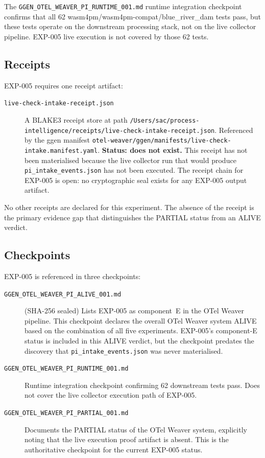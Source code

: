 The \texttt{GGEN\_OTEL\_WEAVER\_PI\_RUNTIME\_001.md} runtime integration checkpoint confirms
that all 62 wasm4pm/wasm4pm-compat/blue\_river\_dam tests pass, but these tests operate on
the downstream processing stack, not on the live collector pipeline. EXP-005 live execution
is not covered by those 62 tests.

\subsection{Receipts}
\label{sec:otel-weaver-exp-005-collector-to-intake-evidence-receipts}

EXP-005 requires one receipt artifact:

\begin{description}
  \item[\texttt{live-check-intake-receipt.json}] A BLAKE3 receipt store at path
        \texttt{/Users/sac/process-intelligence/receipts/live-check-intake-receipt.json}.
        Referenced by the ggen manifest
        \texttt{otel-weaver/ggen/manifests/live-check-intake.manifest.yaml}.
        \textbf{Status: does not exist.} This receipt has not been materialised because the
        live collector run that would produce \texttt{pi\_intake\_events.json} has not been
        executed. The receipt chain for EXP-005 is open: no cryptographic seal exists for any
        EXP-005 output artifact.
\end{description}

No other receipts are declared for this experiment. The absence of the receipt is the primary
evidence gap that distinguishes the PARTIAL status from an ALIVE verdict.

\subsection{Checkpoints}
\label{sec:otel-weaver-exp-005-collector-to-intake-evidence-checkpoints}

EXP-005 is referenced in three checkpoints:

\begin{description}
  \item[\texttt{GGEN\_OTEL\_WEAVER\_PI\_ALIVE\_001.md}] (SHA-256 sealed) Lists EXP-005 as
        component~E in the OTel Weaver pipeline. This checkpoint declares the overall OTel
        Weaver system ALIVE based on the combination of all five experiments. EXP-005's
        component-E status is included in this ALIVE verdict, but the checkpoint predates the
        discovery that \texttt{pi\_intake\_events.json} was never materialised.

  \item[\texttt{GGEN\_OTEL\_WEAVER\_PI\_RUNTIME\_001.md}] Runtime integration checkpoint
        confirming 62 downstream tests pass. Does not cover the live collector execution path
        of EXP-005.

  \item[\texttt{GGEN\_OTEL\_WEAVER\_PI\_PARTIAL\_001.md}] Documents the PARTIAL status of the
        OTel Weaver system, explicitly noting that the live execution proof artifact is absent.
        This is the authoritative checkpoint for the current EXP-005 status.
\end{description}

